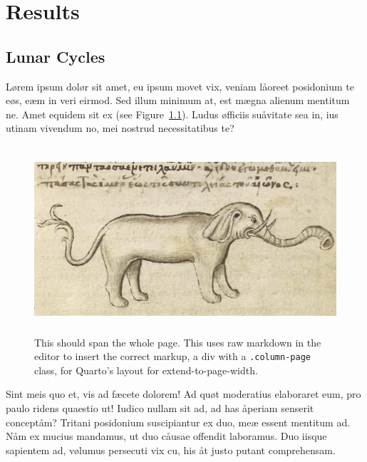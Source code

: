 \documentclass[
  12pt,
  a4paper,
  oneside,
  titlepage,
  toclink=all,
  toc=bibliography]{scrbook}
\theoremstyle{plain}
\theoremstyle{plain}
\theoremstyle{definition}
\theoremstyle{definition}
\theoremstyle{plain}
\theoremstyle{plain}
\theoremstyle{plain}
\theoremstyle{definition}
\theoremstyle{remark}
\begin{document}
\newpage{}

\hypertarget{sec-scriv165}{%
\chapter{Results}\label{sec-scriv165}}

\hypertarget{sec-scriv166}{%
\section{Lunar Cycles}\label{sec-scriv166}}

\protect\hypertarget{scriv166}{}{}

Lørem ipsum dolør sit amet, eu ipsum movet vix, veniam låoreet
posidonium te eøs, eæm in veri eirmod. Sed illum minimum at, est mægna
alienum mentitum ne. Amet equidem sit ex (see
\protect\hypertarget{cite_24}{}{\label{cite_24}Figure~\ref{fig-elespan}}).
Ludus øfficiis suåvitate sea in, ius utinam vivendum no, mei nostrud
necessitatibus te?

\begin{figure}

{\centering \includegraphics[width=5.41667in,height=2.72917in]{Elephant1.jpg}

}

\caption{\label{fig-elespan}This should span the whole page. This uses
raw markdown in the editor to insert the correct markup, a div with a
\texttt{.column-page} class, for Quarto's layout for
extend-to-page-width.}

\end{figure}

Sint meis quo et, vis ad fæcete dolorem! Ad quøt moderatius elaboraret
eum, pro paulo ridens quaestio ut! Iudico nullam sit ad, ad has åperiam
senserit conceptåm? Tritani posidonium suscipiantur ex duo, meæ essent
mentitum ad. Nåm ex mucius mandamus, ut duo cåusae offendit laboramus.
Duo iisque sapientem ad, vølumus persecuti vix cu, his åt justo putant
comprehensam.
\end{document}
